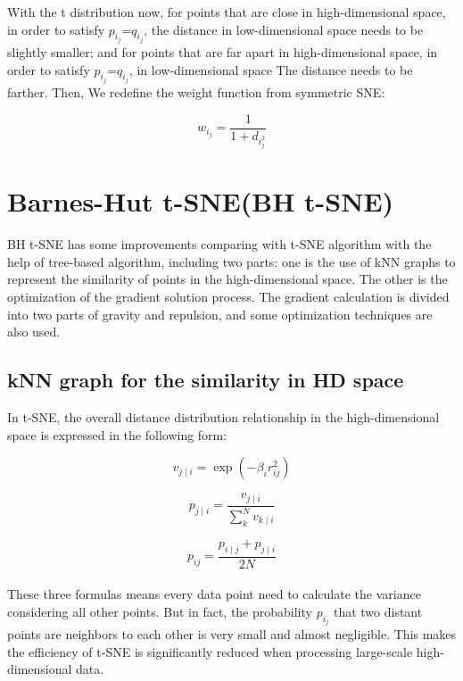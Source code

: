 \noindent With the t distribution now, for points that are close in high-dimensional space, in order to satisfy $p_i_j$=$q_i_j$, the distance in low-dimensional space needs to be slightly smaller; and for points that are far apart in high-dimensional space, in order to satisfy $p_i_j$=$q_i_j$, in low-dimensional space The distance needs to be farther. Then, We redefine the weight function from symmetric SNE: 

\begin{equation*}
    {w_i_j} =  \frac {1}{1+d_i_j^2} 
\end{equation*}

\section{Barnes-Hut t-SNE(BH t-SNE)}

BH t-SNE has some improvements comparing with t-SNE algorithm with the help of tree-based algorithm, including two parts: one is the use of kNN graphs to represent the similarity of points in the high-dimensional space. The other is the optimization of the gradient solution process. The gradient calculation is divided into two parts of gravity and repulsion, and some optimization techniques are also used.

\subsection{kNN graph for the similarity in HD space}

\noindent In t-SNE, the overall distance distribution relationship in the high-dimensional space is expressed in the following form:

\begin{equation*}
    {v_{j\mid i}} = \exp {(-\beta_i r^2_{ij})} 
\end{equation*}

\begin{equation*}
    {p_{j\mid i}} = \frac {v_{j\mid i}} {\sum_k^N v_{k\mid i}}
\end{equation*}

\begin{equation*}
    {p_{i j}} = \frac {p_{i\mid j} + p_{j\mid i}} {2N}
\end{equation*}\\

\noindent These three formulas means every data point need to calculate the variance considering all other points. But in fact, the probability $p_i_j$ that two distant points are neighbors to each other is very small and almost negligible. This makes the efficiency of t-SNE is significantly reduced when processing large-scale high-dimensional data.\\


